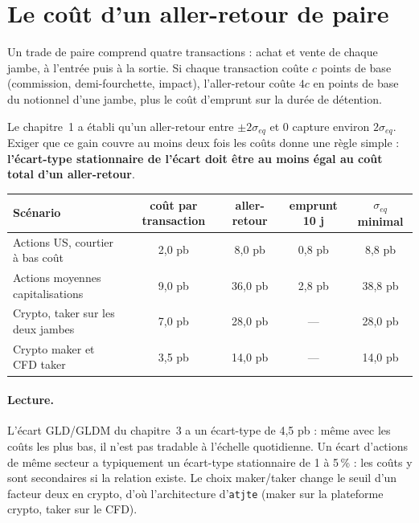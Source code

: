 \section{Le coût d'un aller-retour de paire}

Un trade de paire comprend quatre transactions : achat et vente de chaque jambe, à l'entrée puis à la sortie. Si chaque transaction coûte $c$ points de base (commission, demi-fourchette, impact), l'aller-retour coûte $4c$ en points de base du notionnel d'une jambe, plus le coût d'emprunt sur la durée de détention.

Le chapitre~1 a établi qu'un aller-retour entre $\pm2\sigma_{eq}$ et 0 capture environ $2\sigma_{eq}$. Exiger que ce gain couvre au moins deux fois les coûts donne une règle simple : \textbf{l'écart-type stationnaire de l'écart doit être au moins égal au coût total d'un aller-retour}.

\begin{codebox}
\begin{center}\small
\begin{tabular}{lcccc}
\toprule
Scénario & coût par transaction & aller-retour & emprunt 10 j & $\sigma_{eq}$ minimal\\
\midrule
Actions US, courtier à bas coût & 2,0 pb & 8,0 pb & 0,8 pb & 8,8 pb\\
Actions moyennes capitalisations & 9,0 pb & 36,0 pb & 2,8 pb & 38,8 pb\\
Crypto, taker sur les deux jambes & 7,0 pb & 28,0 pb & — & 28,0 pb\\
Crypto maker et CFD taker & 3,5 pb & 14,0 pb & — & 14,0 pb\\
\bottomrule
\end{tabular}
\end{center}
\end{codebox}

\paragraph{Lecture.} L'écart GLD/GLDM du chapitre~3 a un écart-type de 4,5 pb : même avec les coûts les plus bas, il n'est pas tradable à l'échelle quotidienne. Un écart d'actions de même secteur a typiquement un écart-type stationnaire de 1 à 5\,\% : les coûts y sont secondaires si la relation existe. Le choix maker/taker change le seuil d'un facteur deux en crypto, d'où l'architecture d'\texttt{atjte} (maker sur la plateforme crypto, taker sur le CFD).

